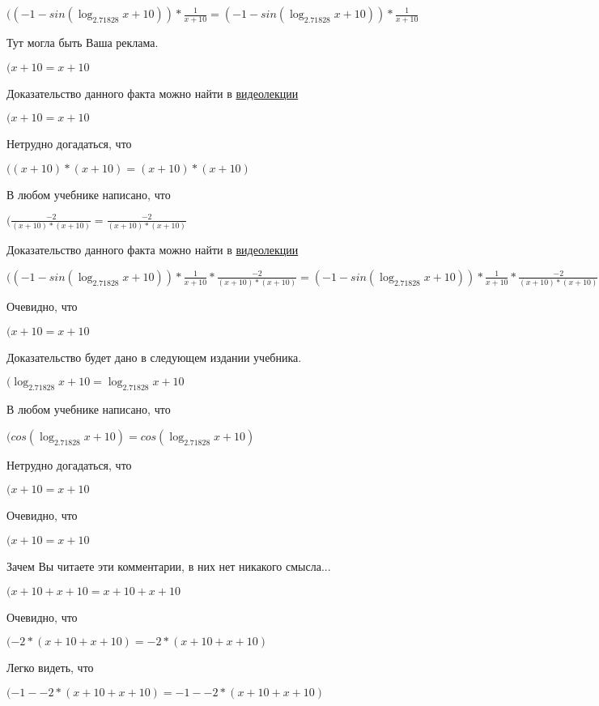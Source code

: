 \documentclass[12pt,a4paper,fleqn]{article}
\theoremstyle{definition}
\begin{document}
$(( -1  - sin(\log_{ 2.71828 }{ x  +  10 })) * \frac{ 1 }{ x  +  10 }
 = ( -1  - sin(\log_{ 2.71828 }{ x  +  10 })) * \frac{ 1 }{ x  +  10 }
$

Тут могла быть Ваша реклама.

$( x  +  10  =  x  +  10 $

Доказательство данного факта можно найти в \href{https://www.youtube.com/watch?v=dQw4w9WgXcQ}{видеолекции}

$( x  +  10  =  x  +  10 $

Нетрудно догадаться, что

$(( x  +  10 ) * ( x  +  10 ) = ( x  +  10 ) * ( x  +  10 )$

В любом учебнике написано, что

$(\frac{ -2 }{( x  +  10 ) * ( x  +  10 )}
 = \frac{ -2 }{( x  +  10 ) * ( x  +  10 )}
$

Доказательство данного факта можно найти в \href{https://www.youtube.com/watch?v=dQw4w9WgXcQ}{видеолекции}

$(( -1  - sin(\log_{ 2.71828 }{ x  +  10 })) * \frac{ 1 }{ x  +  10 }
 * \frac{ -2 }{( x  +  10 ) * ( x  +  10 )}
 = ( -1  - sin(\log_{ 2.71828 }{ x  +  10 })) * \frac{ 1 }{ x  +  10 }
 * \frac{ -2 }{( x  +  10 ) * ( x  +  10 )}
$

Очевидно, что

$( x  +  10  =  x  +  10 $

Доказательство будет дано в следующем издании учебника.

$(\log_{ 2.71828 }{ x  +  10 } = \log_{ 2.71828 }{ x  +  10 }$

В любом учебнике написано, что

$(cos(\log_{ 2.71828 }{ x  +  10 }) = cos(\log_{ 2.71828 }{ x  +  10 })$

Нетрудно догадаться, что

$( x  +  10  =  x  +  10 $

Очевидно, что

$( x  +  10  =  x  +  10 $

Зачем Вы читаете эти комментарии, в них нет никакого смысла...

$( x  +  10  +  x  +  10  =  x  +  10  +  x  +  10 $

Очевидно, что

$( -2  * ( x  +  10  +  x  +  10 ) =  -2  * ( x  +  10  +  x  +  10 )$

Легко видеть, что

$( -1  -  -2  * ( x  +  10  +  x  +  10 ) =  -1  -  -2  * ( x  +  10  +  x  +  10 )$
\end{document}
